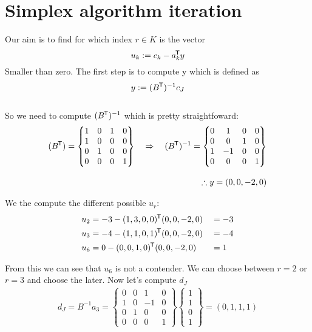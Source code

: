 \documentclass{article}
\newcommand*{\tran}{^{\mkern-1.5mu\mathsf{T}}}%
\begin{document}
	\section{Simplex algorithm iteration}
	Our aim is to find for which index $r\in K$ is the vector
	\begin{equation}
		u_k := c_k - a_k\tran y
	\end{equation}	
	Smaller than zero. The first step is to compute y which is defined as
	\begin{equation}
		y:= (B\tran)^{-1}c_J
	\end{equation}\\
	So we need to compute $(B\tran) ^{-1 }$ which is pretty straightfoward:\\
	\begin{align}
		(B\tran) = \begin{Bmatrix}
		1&0&1&0\\
		1&0&0&0\\
		0&1&0&0\\
		0&0&0&1
		\end{Bmatrix}
		\quad \Rightarrow \quad (B\tran)^{-1} = 
		\begin{Bmatrix}
		0&1&0&0\\
		0&0&1&0\\
		1&-1&0&0\\
		0&0&0&1
		\end{Bmatrix}\\[2ex]
		\therefore y = (0,0,-2,0)
	\end{align}
	
	We the compute the different possible $u_r$:
	\begin{alignat}{2}
		u_2 &= -3 - (1,3,0,0)\tran(0,0,-2,0) &&= -3\\
		u_3 &= -4 - (1,1,0,1)\tran(0,0,-2,0) &&= -4\\
		u_6 &= 0 - (0,0,1,0)\tran(0,0,-2,0) &&= 1
	\end{alignat}
	
	From this we can see that $u_6$ is not a contender. We can choose between $r= 2$ or $r=3$ and choose the later. 
	Now let's compute $d_J$\\
	\begin{align}
		d_J = B^{-1}a_3 =  
		\begin{Bmatrix} 0&0&1&0\\
						1&0&-1&0\\
						0&1&0&0\\
						0&0&0&1
		\end{Bmatrix}
		\begin{Bmatrix}
		1\\1\\0\\1
		\end{Bmatrix}
		= (0,1,1,1)	 	
	\end{align}
	 
\end{document}

